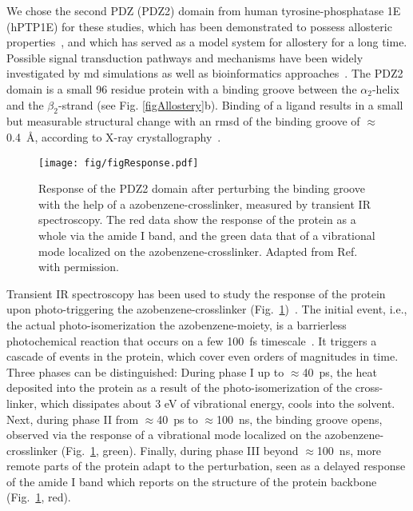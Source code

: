 \documentclass[journal=jacsat,manuscript=article]{achemso}
\begin{document}
We chose the second PDZ (PDZ2) domain from human tyrosine-phosphatase
1E (hPTP1E) for these studies, which has been demonstrated to possess
allosteric properties~\cite{fuentes04}, and which has served as a
model system for allostery for a long time. Possible signal
transduction pathways and mechanisms have been widely investigated by
md simulations as well as bioinformatics approaches~\cite{Ota05,
  DeLosRios05,sharp06, Dhulesia08, Kong09, Gerek11,
  Cilia12,lockless99,suel03,Chi08}. The PDZ2 domain is a small 96
residue protein with a binding groove between the $\alpha_2$-helix and
the $\beta_2$-strand (see Fig. \ref{figAllostery}b). Binding of a
ligand results in a small but measurable structural change with an
rmsd of the binding groove of $\approx$0.4~\AA, according to X-ray
crystallography~\cite{zhang10}.


\begin{figure}[t]
\centering
\texttt{[image: fig/figResponse.pdf]}
\caption{Response of the PDZ2 domain after perturbing the binding
  groove with the help of a azobenzene-crosslinker, measured by
  transient IR spectroscopy. The red data show the response of the
  protein as a whole via the amide I band, and the green data that of
  a vibrational mode localized on the azobenzene-crosslinker. Adapted
  from Ref.~\cite{buchli13} with permission.}
\label{figResponse}
\end{figure}

Transient IR spectroscopy has been used to study the response of the
protein upon photo-triggering the azobenzene-crosslinker
(Fig.~\ref{figResponse})~\cite{buchli13}. The initial event, i.e., the
actual photo-isomerization the azobenzene-moiety, is a barrierless
photochemical reaction that occurs on a few 100~fs
timescale~\cite{naeg97}. It triggers a cascade of events in the
protein, which cover even orders of magnitudes in time. Three phases
can be distinguished: During phase I up to $\approx$40~ps, the heat
deposited into the protein as a result of the photo-isomerization of
the cross-linker, which dissipates about 3 eV of vibrational energy,
cools into the solvent. Next, during phase II from $\approx$40~ps to
$\approx$100~ns, the binding groove opens, observed via the response
of a vibrational mode localized on the azobenzene-crosslinker
(Fig.~\ref{figResponse}, green). Finally, during phase III beyond
$\approx$100~ns, more remote parts of the protein adapt to the
perturbation, seen as a delayed response of the amide I band which
reports on the structure of the protein backbone
(Fig.~\ref{figResponse}, red).
\end{document}
